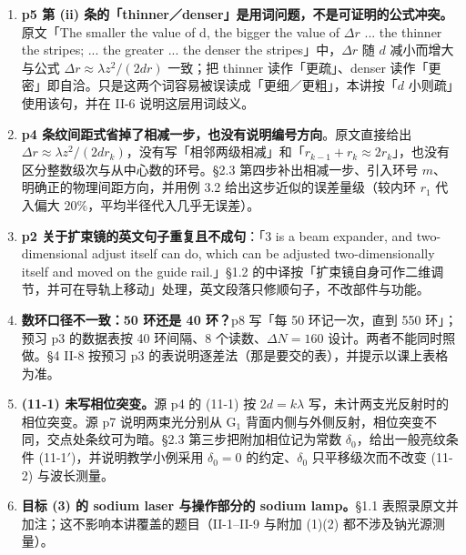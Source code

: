 \documentclass[11pt]{ctexart}
\newcommand{\Dl}{d}
\begin{document}
\begin{enumerate}[leftmargin=2.1em]
  \item \textbf{p5 第 (ii) 条的「thinner／denser」是用词问题，不是可证明的公式冲突。}原文「The smaller the value of d, the bigger the value of $\Delta r$ ... the thinner the stripes; ... the greater ... the denser the stripes」中，$\Delta r$ 随 $\Dl$ 减小而增大与公式 $\Delta r\approx\lambda z^2/(2\Dl r)$ 一致；把 thinner 读作「更疏」、denser 读作「更密」即自洽。只是这两个词容易被误读成「更细／更粗」，本讲按「$\Dl$ 小则疏」使用该句，并在 II-6 说明这层用词歧义。
  \item \textbf{p4 条纹间距式省掉了相减一步，也没有说明编号方向}。原文直接给出 $\Delta r\approx\lambda z^2/(2\Dl r_k)$，没有写「相邻两级相减」和「$r_{k-1}+r_k\approx2r_k$」，也没有区分整数级次与从中心数的环号。§2.3 第四步补出相减一步、引入环号 $m$、明确正的物理间距方向，并用例 3.2 给出这步近似的误差量级（较内环 $r_1$ 代入偏大 $20\%$，平均半径代入几乎无误差）。
  \item \textbf{p2 关于扩束镜的英文句子重复且不成句}：「3 is a beam expander, and two-dimensional adjust itself can do, which can be adjusted two-dimensionally itself and moved on the guide rail.」§1.2 的中译按「扩束镜自身可作二维调节，并可在导轨上移动」处理，英文段落只修顺句子，不改部件与功能。
  \item \textbf{数环口径不一致：50 环还是 40 环？}p8 写「每 50 环记一次，直到 550 环」；预习 p3 的数据表按 40 环间隔、8 个读数、$\Delta N=160$ 设计。两者不能同时照做。§4 II-8 按预习 p3 的表说明逐差法（那是要交的表），并提示以课上表格为准。
  \item \textbf{(11-1) 未写相位突变。}源 p4 的 (11-1) 按 $2\Dl=k\lambda$ 写，未计两支光反射时的相位突变。源 p7 说明两束光分别从 G$_1$ 背面内侧与外侧反射，相位突变不同，交点处条纹可为暗。§2.3 第三步把附加相位记为常数 $\delta_0$，给出一般亮纹条件 (11-1$'$)，并说明教学小例采用 $\delta_0=0$ 的约定、$\delta_0$ 只平移级次而不改变 (11-2) 与波长测量。
  \item \textbf{目标 (3) 的 sodium laser 与操作部分的 sodium lamp。}§1.1 表照录原文并加注；这不影响本讲覆盖的题目（II-1--II-9 与附加 (1)(2) 都不涉及钠光源测量）。
\end{enumerate}

\end{document}
